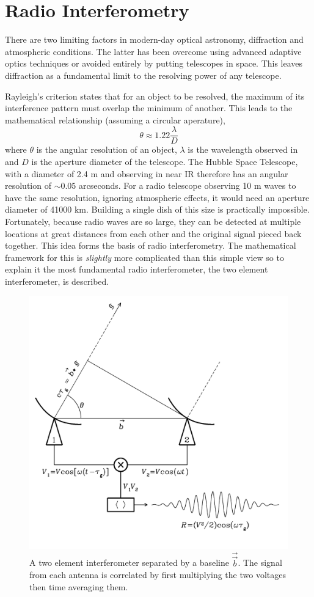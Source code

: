 \section{Radio Interferometry}
There are two limiting factors in modern-day optical astronomy, diffraction and atmospheric conditions. The latter has been overcome using advanced adaptive optics techniques or avoided entirely by putting telescopes in space. This leaves diffraction as a fundamental limit to the resolving power of any telescope.

Rayleigh's criterion states that for an object to be resolved, the maximum of its interference pattern must overlap the minimum of another. This leads to the mathematical relationship (assuming a circular aperature), $$\theta \approx 1.22 \frac{\lambda}{D}$$ where $\theta$ is the angular resolution of an object, $\lambda$ is the wavelength observed in and $D$ is the aperture diameter of the telescope. The Hubble Space Telescope, with a diameter of 2.4 m and observing in near IR therefore has an angular resolution of $\sim 0.05$ arcseconds. For a radio telescope observing 10 m waves to have the same resolution, ignoring atmospheric effects, it would need an aperture diameter of 41000 km. Building a single dish of this size is practically impossible. Fortunately, because radio waves are so large, they can be detected at multiple locations at great distances from each other and the original signal pieced back together. This idea forms the basis of radio interferometry.
The mathematical framework for this is \textit{slightly} more complicated than this simple view so to explain it the most fundamental radio interferometer, the two element interferometer, is described.

\begin{figure}
    \centering
    \includegraphics[width=0.5\columnwidth]{Images/2_elem_int.png}
    \caption[A two element interferometer]{A two element interferometer separated by a baseline $\overrightarrow{\Vec{b}}$. The signal from each antenna is correlated by first multiplying the two voltages then time averaging them.}
    \label{fig:2_el_int}
\end{figure}

